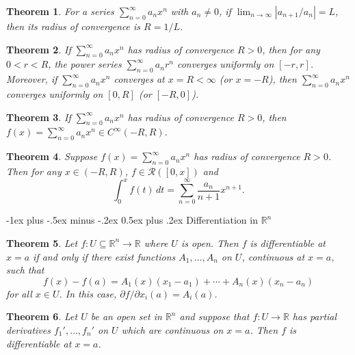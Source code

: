 \documentclass[10pt,landscape]{article}
\makeatletter
\newtheorem{theorem}{Theorem}
\theoremstyle{definition}
\newcommand{\R}{\mathbb{R}}
\renewcommand{\section}{\@startsection{section}{1}{0mm}%
                                {-1ex plus -.5ex minus -.2ex}%
                                {0.5ex plus .2ex}%
                                {\normalfont\large\bfseries}}
\makeatother
\begin{document}
\begin{multicols}{3}
\begin{theorem}
  For a series $\sum_{n = 0}^\infty a_n x^n$ with $a_n \ne 0$,
  if $\lim_{n \to \infty} |a_{n + 1} / a_n| = L$,
  then its radius of convergence is $R = 1 / L$.
\end{theorem}

\begin{theorem}
  If $\sum_{n = 0}^\infty a_n x^n$ has radius of convergence
  $R > 0$, then for any $0 < r < R$, the power
  series $\sum_{n = 0}^\infty a_n r^n$ converges
  uniformly on $[-r, r]$. Moreover, if
  $\sum_{n = 0}^\infty a_n x^n$ converges at
  $x = R < \infty$ (or $x = -R$), then $\sum_{n = 0}^\infty a_n x^n$
  converges uniformly on $[0, R]$ (or $[-R, 0]$).
\end{theorem}

\begin{theorem}
  If $\sum_{n = 0}^\infty a_n x^n$ has radius of
  convergence $R > 0$, then
  $f(x) = \sum_{n = 0}^\infty a_n x^n \in C^\infty(-R, R)$.
\end{theorem}

\begin{theorem}
  Suppose $f(x) = \sum_{n = 0}^\infty a_n x^n$ has
  radius of convergence $R > 0$. Then for any
  $x \in (-R, R)$, $f \in \mathcal{R}([0, x])$
  and
  \[
    \int_0^x f(t)\, dt = \sum_{n = 0}^\infty \frac{a_n}{n + 1} x^{n + 1}.
  \]
\end{theorem}

\section{Differentiation in \texorpdfstring{$\R^n$}{Rn}}
\begin{theorem}
  Let $f : U \subseteq \R^n \to \R$ where $U$ is open.
  Then $f$ is differentiable at $x = a$ if and only
  if there exist functions $A_1, \dots, A_n$ on $U$,
  continuous at $x = a$, such that
  \[
    f(x) - f(a) = A_1(x) (x_1 - a_1) + \cdots + A_n(x) (x_n - a_n)
  \]
  for all $x \in U$. In this case, $\partial f / \partial x_i(a) = A_i(a)$.
\end{theorem}

\begin{theorem}
  Let $U$ be an open set in $\R^n$ and suppose that
  $f : U \to \R$ has partial derivatives $f_1', \dots, f_n'$
  on $U$ which are continuous on $x = a$. Then $f$ is
  differentiable at $x = a$.
\end{theorem}


\end{multicols}
\end{document}
